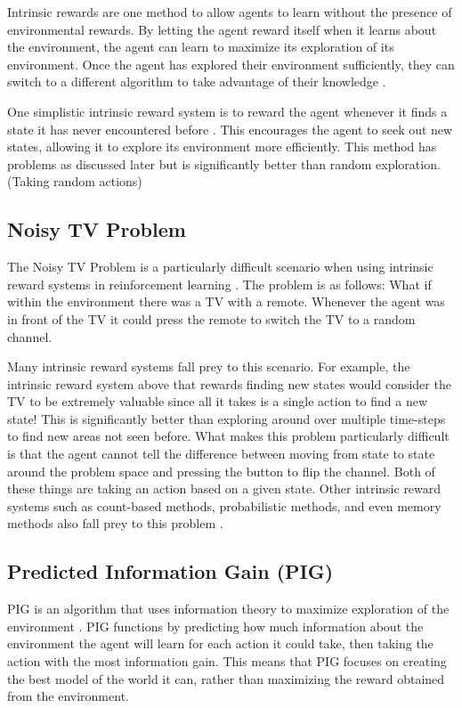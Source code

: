 \documentclass[letterpaper]{article} %
\begin{document}
Intrinsic rewards are one method to allow agents to learn without the presence of environmental rewards. By letting the agent reward itself when it learns about the environment, the agent can learn to maximize its exploration of its environment. Once the agent has explored their environment sufficiently, they can switch to a different algorithm to take advantage of their knowledge \cite{Rein:VIME}.

One simplistic intrinsic reward system is to reward the agent whenever it finds a state it has never encountered before \cite{DBLP:journals/corr/TangHFSCDSTA16}. This encourages the agent to seek out new states, allowing it to explore its environment more efficiently. This method has problems as discussed later but is significantly better than random exploration. (Taking random actions)

\subsection{Noisy TV Problem}
The Noisy TV Problem is a particularly difficult scenario when using intrinsic reward systems in reinforcement learning \cite{DBLP:journals/corr/abs-2008-04388}. The problem is as follows: What if within the environment there was a TV with a remote. Whenever the agent was in front of the TV it could press the remote to switch the TV to a random channel.

Many intrinsic reward systems fall prey to this scenario. For example, the intrinsic reward system above that rewards finding new states would consider the TV to be extremely valuable since all it takes is a single action to find a new state! This is significantly better than exploring around over multiple time-steps to find new areas not seen before. What makes this problem particularly difficult is that the agent cannot tell the difference between moving from state to state around the problem space and pressing the button to flip the channel. Both of these things are taking an action based on a given state. Other intrinsic reward systems such as count-based methods, probabilistic methods, and even memory methods also fall prey to this problem \cite{DBLP:journals/corr/abs-1908-06976}.

\subsection{Predicted Information Gain (PIG)}
PIG is an algorithm that uses information theory to maximize exploration of the environment \cite{10.3389/fncir.2013.00037}. PIG functions by predicting how much information about the environment the agent will learn for each action it could take, then taking the action with the most information gain. This means that PIG focuses on creating the best model of the world it can, rather than maximizing the reward obtained from the environment.
\end{document}
